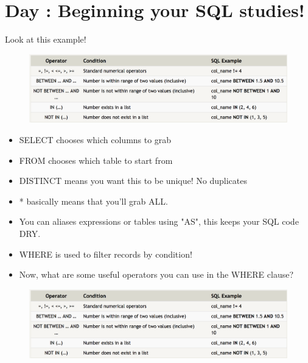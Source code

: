 \documentclass{42-en}
\begin{document}
\chapter{Day \exercicenumber: Beginning your SQL studies! }

\makeheaderfiles

	Look at this example! \\
    
            \begin{figure}[H]
                \begin{center}
                    \includegraphics[width=14cm]{operators.png}
                \end{center}
            \end{figure}

	\begin{itemize}\itemsep1pt 
		\item SELECT chooses which columns to grab 
		\item FROM chooses which table to start from
		\item DISTINCT means you want this to be unique! No duplicates 
		\item * basically means that  you'll grab ALL. 
		\item You can aliases expressions or tables using "AS", this keeps your SQL code DRY. 
		\item WHERE is used to filter records by condition! 
		\item Now, what are some useful operators you can use in the WHERE clause?  
	\end{itemize}

    
            \begin{figure}[H]
                \begin{center}
                    \includegraphics[width=14cm]{operators.png}
                \end{center}
            \end{figure}
\end{document}
